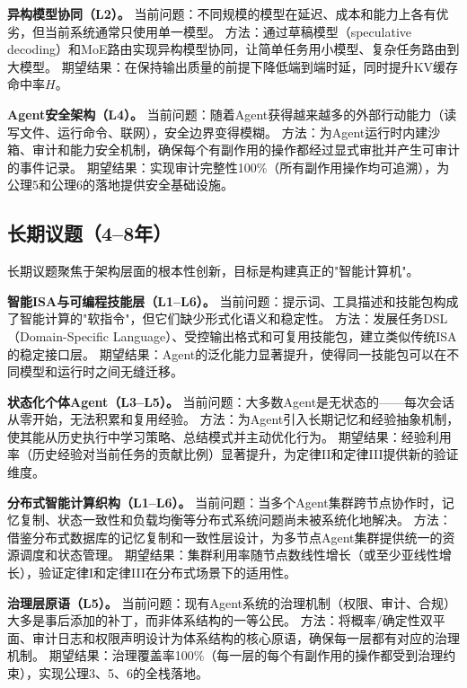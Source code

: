 \textbf{异构模型协同（L2）。}
当前问题：不同规模的模型在延迟、成本和能力上各有优劣，但当前系统通常只使用单一模型。
方法：通过草稿模型（speculative decoding\cite{leviathan2023speculative}）和MoE路由\cite{switch2022,mixtral2024}实现异构模型协同，让简单任务用小模型、复杂任务路由到大模型。
期望结果：在保持输出质量的前提下降低端到端时延，同时提升KV缓存命中率$H$。

\textbf{Agent安全架构（L4）。}
当前问题：随着Agent获得越来越多的外部行动能力（读写文件、运行命令、联网），安全边界变得模糊。
方法：为Agent运行时内建沙箱、审计和能力安全机制\cite{debenedetti2025camel,ironclaw2025,agenticsecurity2025}，确保每个有副作用的操作都经过显式审批并产生可审计的事件记录。
期望结果：实现审计完整性100\%（所有副作用操作均可追溯），为公理5和公理6的落地提供安全基础设施。

\subsection{长期议题（4--8年）}

长期议题聚焦于架构层面的根本性创新，目标是构建真正的"智能计算机"。

\textbf{智能ISA与可编程技能层（L1--L6）。}
当前问题：提示词、工具描述和技能包构成了智能计算的"软指令"，但它们缺少形式化语义和稳定性。
方法：发展任务DSL（Domain-Specific Language）、受控输出格式和可复用技能包，建立类似传统ISA的稳定接口层。
期望结果：Agent的泛化能力显著提升，使得同一技能包可以在不同模型和运行时之间无缝迁移。

\textbf{状态化个体Agent（L3--L5）。}
当前问题：大多数Agent是无状态的——每次会话从零开始，无法积累和复用经验。
方法：为Agent引入长期记忆和经验抽象机制，使其能从历史执行中学习策略、总结模式并主动优化行为\cite{amem2025,agentmemorysurvey2025}。
期望结果：经验利用率（历史经验对当前任务的贡献比例）显著提升，为定律II和定律III提供新的验证维度。

\textbf{分布式智能计算织构（L1--L6）。}
当前问题：当多个Agent集群跨节点协作时，记忆复制、状态一致性和负载均衡等分布式系统问题尚未被系统化地解决。
方法：借鉴分布式数据库的记忆复制和一致性层设计\cite{spanner2012,raft2014}，为多节点Agent集群提供统一的资源调度和状态管理。
期望结果：集群利用率随节点数线性增长（或至少亚线性增长），验证定律I和定律III在分布式场景下的适用性。

\textbf{治理层原语（L5）。}
当前问题：现有Agent系统的治理机制（权限、审计、合规）大多是事后添加的补丁，而非体系结构的一等公民。
方法：将概率/确定性双平面、审计日志和权限声明设计为体系结构的核心原语\cite{arbiteros2025,ironclaw2025}，确保每一层都有对应的治理机制。
期望结果：治理覆盖率100\%（每一层的每个有副作用的操作都受到治理约束），实现公理3、5、6的全栈落地。

